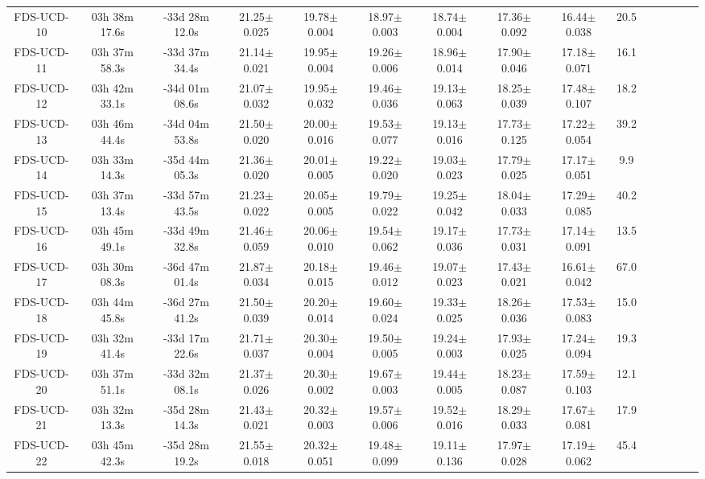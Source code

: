 \documentclass[fleqn,usenatbib]{mnras}
\begin{document}
\begin{table*}
\begin{tabular}{ ccccccccccccccc }
FDS-UCD-10 & 03h 38m 17.6s & -33d 28m 12.0s & 21.25$\pm$0.025 & 19.78$\pm$0.004 & 18.97$\pm$0.003 & 18.74$\pm$0.004 & 17.36$\pm$0.092 & 16.44$\pm$0.038 & 20.5 \\ 
FDS-UCD-11 & 03h 37m 58.3s & -33d 37m 34.4s & 21.14$\pm$0.021 & 19.95$\pm$0.004 & 19.26$\pm$0.006 & 18.96$\pm$0.014 & 17.90$\pm$0.046 & 17.18$\pm$0.071 & 16.1 \\ 
FDS-UCD-12 & 03h 42m 33.1s & -34d 01m 08.6s & 21.07$\pm$0.032 & 19.95$\pm$0.032 & 19.46$\pm$0.036 & 19.13$\pm$0.063 & 18.25$\pm$0.039 & 17.48$\pm$0.107 & 18.2 \\ 
FDS-UCD-13 & 03h 46m 44.4s & -34d 04m 53.8s & 21.50$\pm$0.020 & 20.00$\pm$0.016 & 19.53$\pm$0.077 & 19.13$\pm$0.016 & 17.73$\pm$0.125 & 17.22$\pm$0.054 & 39.2 \\ 
FDS-UCD-14 & 03h 33m 14.3s & -35d 44m 05.3s & 21.36$\pm$0.020 & 20.01$\pm$0.005 & 19.22$\pm$0.020 & 19.03$\pm$0.023 & 17.79$\pm$0.025 & 17.17$\pm$0.051 & 9.9 \\ 
FDS-UCD-15 & 03h 37m 13.4s & -33d 57m 43.5s & 21.23$\pm$0.022 & 20.05$\pm$0.005 & 19.79$\pm$0.022 & 19.25$\pm$0.042 & 18.04$\pm$0.033 & 17.29$\pm$0.085 & 40.2 \\ 
FDS-UCD-16 & 03h 45m 49.1s & -33d 49m 32.8s & 21.46$\pm$0.059 & 20.06$\pm$0.010 & 19.54$\pm$0.062 & 19.17$\pm$0.036 & 17.73$\pm$0.031 & 17.14$\pm$0.091 & 13.5 \\ 
FDS-UCD-17 & 03h 30m 08.3s & -36d 47m 01.4s & 21.87$\pm$0.034 & 20.18$\pm$0.015 & 19.46$\pm$0.012 & 19.07$\pm$0.023 & 17.43$\pm$0.021 & 16.61$\pm$0.042 & 67.0 \\ 
FDS-UCD-18 & 03h 44m 45.8s & -36d 27m 41.2s & 21.50$\pm$0.039 & 20.20$\pm$0.014 & 19.60$\pm$0.024 & 19.33$\pm$0.025 & 18.26$\pm$0.036 & 17.53$\pm$0.083 & 15.0 \\ 
FDS-UCD-19 & 03h 32m 41.4s & -33d 17m 22.6s & 21.71$\pm$0.037 & 20.30$\pm$0.004 & 19.50$\pm$0.005 & 19.24$\pm$0.003 & 17.93$\pm$0.025 & 17.24$\pm$0.094 & 19.3 \\ 
FDS-UCD-20 & 03h 37m 51.1s & -33d 32m 08.1s & 21.37$\pm$0.026 & 20.30$\pm$0.002 & 19.67$\pm$0.003 & 19.44$\pm$0.005 & 18.23$\pm$0.087 & 17.59$\pm$0.103 & 12.1 \\ 
FDS-UCD-21 & 03h 32m 13.3s & -35d 28m 14.3s & 21.43$\pm$0.021 & 20.32$\pm$0.003 & 19.57$\pm$0.006 & 19.52$\pm$0.016 & 18.29$\pm$0.033 & 17.67$\pm$0.081 & 17.9 \\ 
FDS-UCD-22 & 03h 45m 42.3s & -35d 28m 19.2s & 21.55$\pm$0.018 & 20.32$\pm$0.051 & 19.48$\pm$0.099 & 19.11$\pm$0.136 & 17.97$\pm$0.028 & 17.19$\pm$0.062 & 45.4 \\ 

\end{tabular}
\end{table*}
\end{document}

